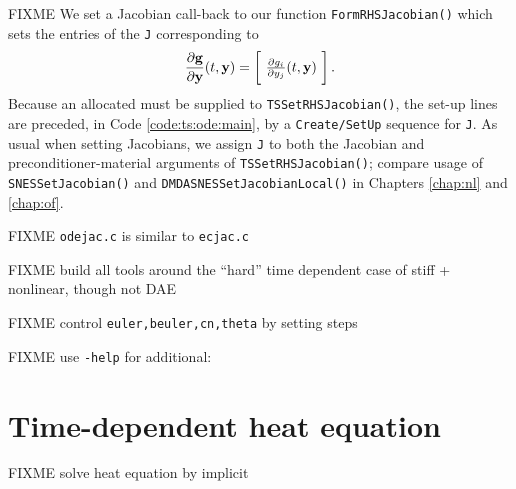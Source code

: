 FIXME We set a Jacobian call-back to our function \texttt{FormRHSJacobian()} which sets the entries of the \pMat \texttt{J} corresponding to
    $$\frac{\partial \mathbf{g}}{\partial \mathbf{y}}(t,\mathbf{y}) = \begin{bmatrix}\phantom{\bigg|} \frac{\partial g_i}{\partial y_j}(t,\mathbf{y}) \phantom{\bigg|}\end{bmatrix}.$$
Because an allocated \pMat must be supplied to \texttt{TSSetRHSJacobian()}, the \pTS set-up lines are preceded, in Code \ref{code:ts:ode:main}, by a \texttt{Create/SetUp} sequence for \pMat \texttt{J}.  As usual when setting Jacobians, we assign \texttt{J} to both the Jacobian and preconditioner-material arguments of \texttt{TSSetRHSJacobian()}; compare usage of \texttt{SNESSetJacobian()} and \texttt{DMDASNESSetJacobianLocal()} in Chapters \ref{chap:nl} and \ref{chap:of}.



FIXME \texttt{odejac.c} is similar to \texttt{ecjac.c}

FIXME build all tools around the ``hard'' time dependent case of stiff + nonlinear, though not DAE

FIXME control \texttt{euler,beuler,cn,theta} by setting steps

FIXME use \texttt{-help} for additional:





\section{Time-dependent heat equation}

FIXME solve heat equation by implicit

